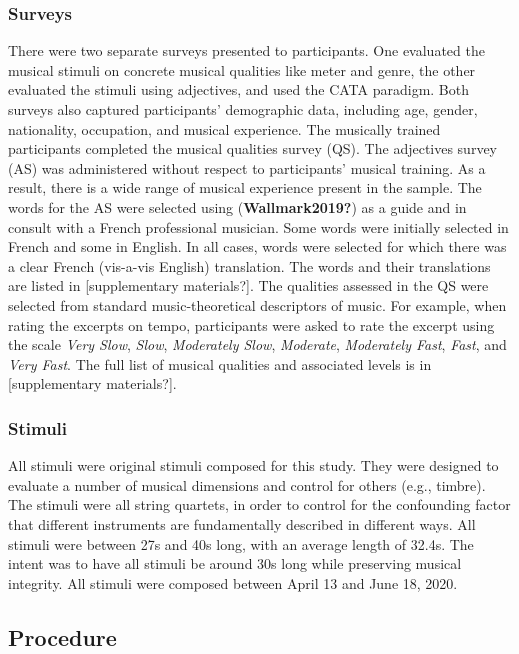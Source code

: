\documentclass[
  english,
  man]{apa6}
\begin{document}
\hypertarget{surveys}{%
\subsubsection{Surveys}\label{surveys}}

There were two separate surveys presented to participants. One evaluated the musical stimuli on concrete musical qualities like meter and genre, the other evaluated the stimuli using adjectives, and used the CATA paradigm. Both surveys also captured participants' demographic data, including age, gender, nationality, occupation, and musical experience. The musically trained participants completed the musical qualities survey (QS). The adjectives survey (AS) was administered without respect to participants' musical training. As a result, there is a wide range of musical experience present in the sample.
The words for the AS were selected using (\textbf{Wallmark2019?}) as a guide and in consult with a French professional musician. Some words were initially selected in French and some in English. In all cases, words were selected for which there was a clear French (vis-a-vis English) translation. The words and their translations are listed in {[}supplementary materials?{]}. The qualities assessed in the QS were selected from standard music-theoretical descriptors of music. For example, when rating the excerpts on tempo, participants were asked to rate the excerpt using the scale \emph{Very Slow}, \emph{Slow}, \emph{Moderately Slow}, \emph{Moderate}, \emph{Moderately Fast}, \emph{Fast}, and \emph{Very Fast}. The full list of musical qualities and associated levels is in {[}supplementary materials?{]}.

\hypertarget{stimuli}{%
\subsubsection{Stimuli}\label{stimuli}}

All stimuli were original stimuli composed for this study. They were designed to evaluate a number of musical dimensions and control for others (e.g., timbre). The stimuli were all string quartets, in order to control for the confounding factor that different instruments are fundamentally described in different ways. All stimuli were between 27s and 40s long, with an average length of 32.4s. The intent was to have all stimuli be around 30s long while preserving musical integrity. All stimuli were composed between April 13 and June 18, 2020.

\hypertarget{procedure}{%
\subsection{Procedure}\label{procedure}}
\end{document}
